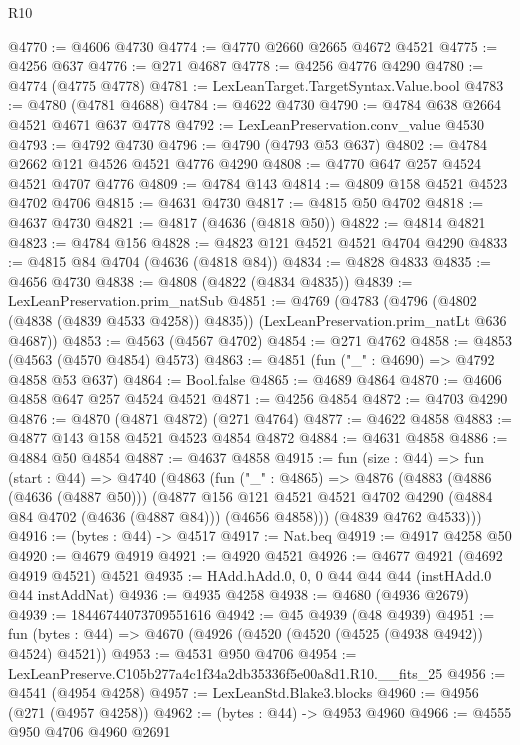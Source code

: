 \begin{lexlean}{R10}
\begin{coremodule}
@4770 := @4606 @4730
@4774 := @4770 @2660 @2665 @4672 @4521
@4775 := @4256 @637
@4776 := @271 @4687
@4778 := @4256 @4776 @4290
@4780 := @4774 (@4775 @4778)
@4781 := LexLeanTarget.TargetSyntax.Value.bool
@4783 := @4780 (@4781 @4688)
@4784 := @4622 @4730
@4790 := @4784 @638 @2664 @4521 @4671 @637 @4778
@4792 := LexLeanPreservation.conv_value @4530
@4793 := @4792 @4730
@4796 := @4790 (@4793 @53 @637)
@4802 := @4784 @2662 @121 @4526 @4521 @4776 @4290
@4808 := @4770 @647 @257 @4524 @4521 @4707 @4776
@4809 := @4784 @143
@4814 := @4809 @158 @4521 @4523 @4702 @4706
@4815 := @4631 @4730
@4817 := @4815 @50 @4702
@4818 := @4637 @4730
@4821 := @4817 (@4636 (@4818 @50))
@4822 := @4814 @4821
@4823 := @4784 @156
@4828 := @4823 @121 @4521 @4521 @4704 @4290
@4833 := @4815 @84 @4704 (@4636 (@4818 @84))
@4834 := @4828 @4833
@4835 := @4656 @4730
@4838 := @4808 (@4822 (@4834 @4835))
@4839 := LexLeanPreservation.prim_natSub
@4851 := @4769
    (@4783
      (@4796 (@4802 (@4838 (@4839 @4533 @4258)) @4835))
      (LexLeanPreservation.prim_natLt @636 @4687))
@4853 := @4563 (@4567 @4702)
@4854 := @271 @4762
@4858 := @4853 (@4563 (@4570 @4854) @4573)
@4863 := @4851 (fun ("_" : @4690) => @4792 @4858 @53 @637)
@4864 := Bool.false
@4865 := @4689 @4864
@4870 := @4606 @4858 @647 @257 @4524 @4521
@4871 := @4256 @4854
@4872 := @4703 @4290
@4876 := @4870 (@4871 @4872) (@271 @4764)
@4877 := @4622 @4858
@4883 := @4877 @143 @158 @4521 @4523 @4854 @4872
@4884 := @4631 @4858
@4886 := @4884 @50 @4854
@4887 := @4637 @4858
@4915 := fun (size : @44) =>
  fun (start : @44) =>
  @4740
    (@4863
      (fun ("_" : @4865) =>
      @4876
        (@4883
          (@4886 (@4636 (@4887 @50)))
          (@4877
            @156
            @121
            @4521
            @4521
            @4702
            @4290
            (@4884 @84 @4702 (@4636 (@4887 @84)))
            (@4656 @4858)))
        (@4839 @4762 @4533)))
@4916 := (bytes : @44) -> @4517
@4917 := Nat.beq
@4919 := @4917 @4258 @50
@4920 := @4679 @4919
@4921 := @4920 @4521
@4926 := @4677 @4921 (@4692 @4919 @4521) @4521
@4935 := HAdd.hAdd.{0, 0, 0} @44 @44 @44 (instHAdd.{0} @44 instAddNat)
@4936 := @4935 @4258
@4938 := @4680 (@4936 @2679)
@4939 := 18446744073709551616
@4942 := @45 @4939 (@48 @4939)
@4951 := fun (bytes : @44) => @4670 (@4926 (@4520 (@4520 (@4525 (@4938 @4942)) @4524) @4521))
@4953 := @4531 @950 @4706
@4954 := LexLeanPreserve.C105b277a4c1f34a2db35336f5e00a8d1.R10.__fits_25
@4956 := @4541 (@4954 @4258)
@4957 := LexLeanStd.Blake3.blocks
@4960 := @4956 (@271 (@4957 @4258))
@4962 := (bytes : @44) -> @4953 @4960
@4966 := @4555 @950 @4706 @4960 @2691

\end{coremodule}
\end{lexlean}
